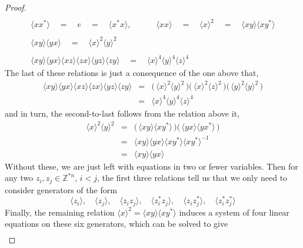 \documentclass{amsbook} %
\numberwithin{section}{chapter}
\begin{document}
\begin{proof}
\[\begin{array}{c}
			\\
			\langle xx^* \rangle \quad = \quad e \quad = \quad \langle x^*x \rangle, \quad \quad \quad \langle xx \rangle \quad = \quad \langle x \rangle^2  \quad = \quad \langle xy \rangle \langle xy^* \rangle \\
			\\
			\langle xy \rangle \langle yx \rangle \quad = \quad \langle x \rangle^2 \langle y \rangle^2 \\
			\\
			\langle xy \rangle \langle yx \rangle \langle xz \rangle \langle zx \rangle \langle yz \rangle \langle zy \rangle \quad = \quad \langle x \rangle^4 \langle y \rangle^4 \langle z \rangle^4 
		\end{array}
\]
The last of these relations is just a consequence of the one above that,
\[ \begin{array}{rll}
			\langle xy \rangle \langle yx \rangle \langle xz \rangle \langle zx \rangle \langle yz \rangle \langle zy \rangle & = & \big( \, \langle x \rangle^2 \langle y \rangle^2 \, \big)\big( \, \langle x \rangle^2 \langle z \rangle^2 \, \big)\big( \, \langle y \rangle^2 \langle y \rangle^2 \, \big) \\
			& = & \langle x \rangle^4 \langle y \rangle^4 \langle z \rangle^4 
		\end{array}
\]
and in turn, the second-to-last follows from the relation above it,
\[ \begin{array}{rll}
			\langle x \rangle^2 \langle y \rangle^2  & = & \big( \, \langle xy \rangle \langle xy^* \rangle \, \big)\big( \, \langle yx \rangle \langle yx^* \rangle \, \big) \\
			& = & \langle xy \rangle \langle yx \rangle \langle xy^* \rangle  \langle xy^* \rangle^{-1} \\
			& = & \langle xy \rangle \langle yx \rangle
		\end{array}
\]
Without these, we are just left with equations in two or fewer variables. Then for any two $z_i, z_j \in \mathbb{Z}^{\ast n}$, $i<j$, the first three relations tell us that we only need to consider generators of the form
\[ \langle z_i \rangle, \quad \langle z_j \rangle, \quad \langle z_i z_j \rangle, \quad \langle z_i^* z_j\rangle, \quad \langle z_i z_j^* \rangle, \quad \langle z_i^* z_j^* \rangle \]
Finally, the remaining relation $\langle x \rangle^2  =  \langle xy \rangle \langle xy^* \rangle$ induces a system of four linear equations on these six generators, which can be solved to give
\[ \begin{array}{rll}

\end{array}\]
\end{proof}
\end{document}
